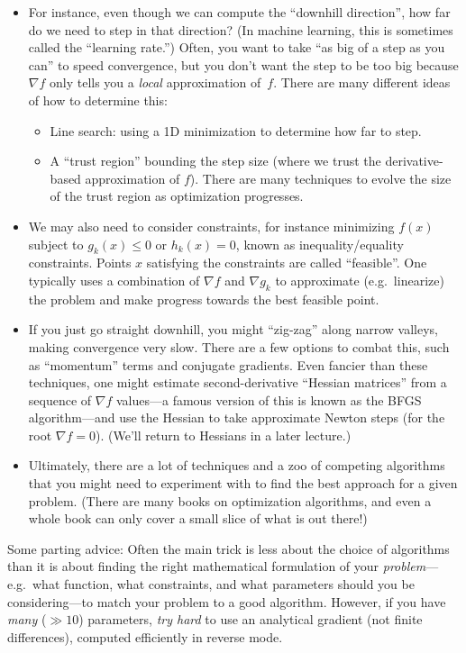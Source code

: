 \begin{itemize}
    \item For instance, even though we can compute the ``downhill direction'', how far do we need to step in that direction? (In machine learning, this is sometimes called the ``learning rate.'') Often, you want to take ``as big of a step as you can'' to speed convergence, but you  don't want the step to be too big because $\nabla f$ only tells you a \emph{local} approximation of~$f$. There are many different ideas of how to determine this:
\begin{itemize}
    \item Line search: using a 1D minimization to determine how far to step.
    \item A ``trust region'' bounding the step size (where we trust the derivative-based approximation of $f$). There are many techniques to evolve the size of the trust region as optimization progresses.
\end{itemize}
\item We may also need to consider constraints, for instance 
minimizing $f(x)$ subject to $g_k(x) \leq 0$  or $h_k(x)=0$,
 known as inequality/equality constraints.
Points $x$ satisfying the constraints are called ``feasible''.   One typically uses a combination of $\nabla f$ and $\nabla g_k$ to approximate (e.g.~linearize) the problem and make progress towards the best feasible point.

\item If you just go straight downhill, you might ``zig-zag'' along narrow valleys, making convergence very slow. There are a few options to combat this, such as ``momentum'' terms and conjugate gradients. Even fancier than these techniques, one might estimate second-derivative ``Hessian matrices'' from a sequence of $\nabla f$ values---a famous version of this is known as the BFGS algorithm---and use the Hessian to take approximate Newton steps (for the root $\nabla f = 0$).  (We'll return to Hessians in a later lecture.)
\item Ultimately, there are a lot of techniques and a zoo of competing algorithms that you might need to experiment with to find the best approach for a given problem.  (There are many books on optimization algorithms, and even a whole book can only cover a small slice of what is out there!)
\end{itemize}

Some parting advice: Often the main trick is less about the choice of algorithms than it is about finding the right mathematical formulation of your \emph{problem}---e.g.~what function, what constraints, and what parameters should you be considering---to match your problem to a good algorithm. However, if you have \textit{many} ($\gg 10$) parameters, \textit{try hard} to use an analytical gradient (not finite differences), computed efficiently in reverse mode.

